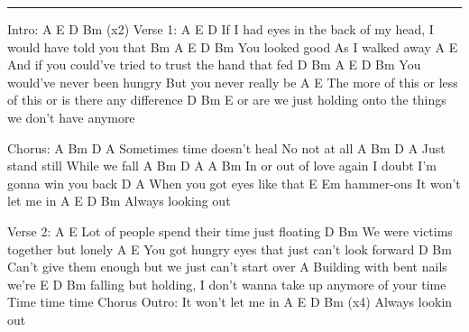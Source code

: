\noindent\rule{\columnwidth}{1pt}

\begin{lstsong}
Intro:
A   E   D   Bm   (x2)
Verse 1:
A                    E                             D
If I had eyes in the back of my head, I would have told you that
                     Bm               A      E     D     Bm
You looked good As I walked away
A                    E
And if you could've tried to trust the hand that fed
             D             Bm                           A    E    D    Bm
You would've never been hungry But you never really be
       A                            E
The more of this or less of this or is there any difference
   D                            Bm                        E
or are we just holding onto the things we don't have anymore

Chorus:
          A            Bm   D         A
Sometimes time doesn't heal No not at all
A          Bm    D            A
Just stand still While we fall
A     Bm          D     A                 A       Bm
In or out of love again I doubt I'm gonna win you back
D            A
When you got eyes like that
                   E Em hammer-ons
It won't let me in
               A   E   D   Bm
Always looking out

Verse 2:
A                         E
Lot of people spend their time just floating
D                   Bm
We were victims together but lonely
A                        E
You got hungry eyes that just can't look forward
D                             Bm
Can't give them enough but we just can't start over
A
Building with bent nails we're
E                     D                     Bm
falling but holding, I don't wanna take up anymore of your time
Time time time
Chorus
Outro:
It won't let me in
                A   E   D   Bm  (x4)
Always lookin out
\end{lstsong}
\newpage


